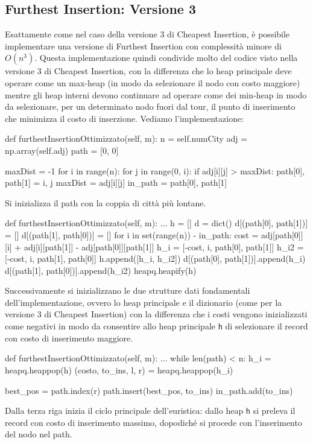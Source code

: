 \documentclass[a4paper,12pt]{report}
\begin{document}
\subsection{Furthest Insertion: Versione 3}
Esattamente come nel caso della versione 3 di Cheapest Insertion, è possibile implementare una versione di Furthest Insertion con complessità minore di $O(n^3)$. Questa implementazione quindi condivide molto del codice visto nella versione 3 di Cheapest Insertion, con la differenza che lo heap principale deve operare come un max-heap (in modo da selezionare il nodo con costo maggiore) mentre gli heap interni devono continuare ad operare come dei min-heap in modo da selezionare, per un determinato nodo fuori dal tour, il punto di inserimento che minimizza il costo di inserzione. Vediamo l'implementazione:
\begin{python}
def furthestInsertionOttimizzato(self, m):
  n = self.numCity
  adj = np.array(self.adj)
  path = [0, 0]

  maxDist = -1
  for i in range(n):
    for j in range(0, i):
      if adj[i][j] > maxDist:
        path[0], path[1] = i, j
        maxDist = adj[i][j]
  in_path = {path[0], path[1]}
\end{python}
Si inizializza il path con la coppia di città più lontane.
\begin{python}
def furthestInsertionOttimizzato(self, m):
  ...
  h = []
  d = dict()
  d[(path[0], path[1])] = []
  d[(path[1], path[0])] = []
  for i in set(range(n)) - in_path:
    cost = adj[path[0]][i] + adj[i][path[1]] - adj[path[0]][path[1]]
    h_i = [-cost, i, path[0], path[1]]
    h_i2 = [-cost, i, path[1], path[0]]
    h.append([h_i, h_i2])
    d[(path[0], path[1])].append(h_i)
    d[(path[1], path[0])].append(h_i2)
  heapq.heapify(h)
\end{python}
Successivamente si inizializzano le due strutture dati fondamentali dell'implementazione, ovvero lo heap principale e il dizionario (come per la versione 3 di Cheapest Insertion) con la differenza che i costi vengono inizializzati come negativi in modo da consentire allo heap principale \lstinline!h! di selezionare il record con costo di inserimento maggiore.
\begin{python}
def furthestInsertionOttimizzato(self, m):
  ...
  while len(path) < n:
    h_i = heapq.heappop(h)
    (costo, to_ins, l, r) = heapq.heappop(h_i)

    best_pos = path.index(r)
    path.insert(best_pos, to_ins)
    in_path.add(to_ins)
\end{python}
Dalla terza riga inizia il ciclo principale dell'euristica: dallo heap \lstinline!h! si preleva il record con costo di inserimento massimo, dopodiché si procede con l'inserimento del nodo nel path.
\end{document}
